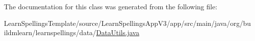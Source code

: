 The documentation for this class was generated from the following file\+:\begin{DoxyCompactItemize}
\item 
Learn\+Spellings\+Template/source/\+Learn\+Spellings\+App\+V3/app/src/main/java/org/buildmlearn/learnspellings/data/\hyperlink{LearnSpellingsTemplate_2source_2LearnSpellingsAppV3_2app_2src_2main_2java_2org_2buildmlearn_2leaaf439b0d67e1b2f3f955067c37f1bc25}{Data\+Utils.\+java}\end{DoxyCompactItemize}

